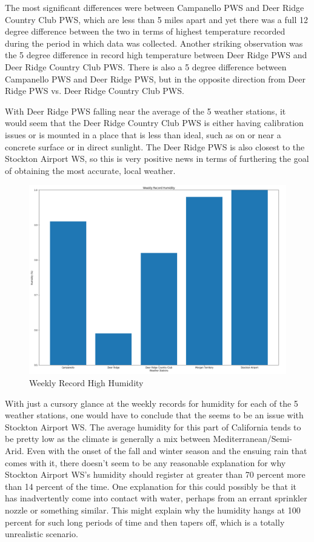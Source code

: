 \documentclass[sigconf]{acmart}
\begin{document}
The most significant differences were between Campanello PWS and Deer Ridge Country Club PWS, which are less than 5 miles apart and yet there was a full 12 degree difference between the two in terms of highest temperature recorded during the period in which data was collected. Another striking observation was the 5 degree difference in record high temperature between Deer Ridge PWS and Deer Ridge Country Club PWS. There is also a 5 degree difference between Campanello PWS and Deer Ridge PWS, but in the opposite direction from Deer Ridge PWS vs. Deer Ridge Country Club PWS. 

With Deer Ridge PWS falling near the average of the 5 weather stations, it would seem that the Deer Ridge Country Club PWS is either having calibration issues or is mounted in a place that is less than ideal, such as on or near a concrete surface or in direct sunlight. The Deer Ridge PWS is also closest to the Stockton Airport WS, so this is very positive news in terms of furthering the goal of obtaining the most accurate, local weather.

\begin{figure}[H]
    \centering
    \includegraphics[width=\columnwidth]{images/WK_REC_HUM.PNG}
    \caption{Weekly Record High Humidity}
\end{figure}

With just a cursory glance at the weekly records for humidity for each of the 5 weather stations, one would have to conclude that the seems to be an issue with Stockton Airport WS. The average humidity for this part of California tends to be pretty low as the climate is generally a mix between Mediterranean/Semi-Arid. Even with the onset of the fall and winter season and the ensuing rain that comes with it, there doesn't seem to be any reasonable explanation for why Stockton Airport WS's humidity should register at greater than 70 percent more than 14 percent of the time. One explanation for this could possibly be that it has inadvertently come into contact with water, perhaps from an errant sprinkler nozzle or something similar. This might explain why the humidity hangs at 100 percent for such long periods of time and then tapers off, which is a totally unrealistic scenario. 
\end{document}
